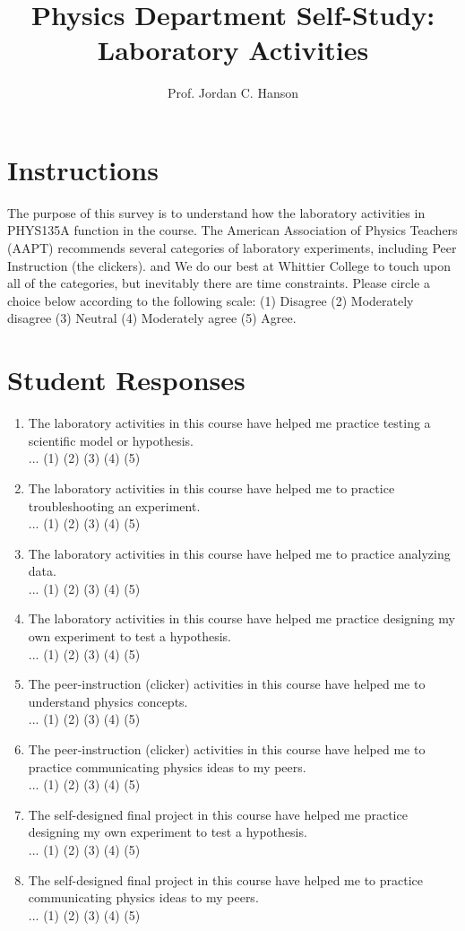 \documentclass{article}
\begin{document}
\title{Physics Department Self-Study: Laboratory Activities}
\author{Prof. Jordan C. Hanson}

\maketitle

\section{Instructions}

The purpose of this survey is to understand how the laboratory activities in PHYS135A function in the course.  The American Association of Physics Teachers (AAPT) recommends several categories of laboratory experiments, including Peer Instruction (the clickers).  and We do our best at Whittier College to touch upon all of the categories, but inevitably there are time constraints.  Please circle a choice below according to the following scale: (1) Disagree (2) Moderately disagree (3) Neutral (4) Moderately agree (5) Agree.

\section{Student Responses}

\begin{enumerate}
\item The laboratory activities in this course have helped me practice testing a scientific model or hypothesis. \\ ... (1) (2) (3) (4) (5)
\item The laboratory activities in this course have helped me to practice troubleshooting an experiment. \\ ... (1) (2) (3) (4) (5)
\item The laboratory activities in this course have helped me to practice analyzing data. \\ ... (1) (2) (3) (4) (5)
\item The laboratory activities in this course have helped me practice designing my own experiment to test a hypothesis. \\ ... (1) (2) (3) (4) (5)
\item The peer-instruction (clicker) activities in this course have helped me to understand physics concepts. \\ ... (1) (2) (3) (4) (5)
\item The peer-instruction (clicker) activities in this course have helped me to practice communicating physics ideas to my peers. \\ ... (1) (2) (3) (4) (5)
\item The self-designed final project in this course have helped me practice designing my own experiment to test a hypothesis. \\ ... (1) (2) (3) (4) (5)
\item The self-designed final project in this course have helped me to practice communicating physics ideas to my peers. \\ ... (1) (2) (3) (4) (5)
\end{enumerate}
\end{document}
